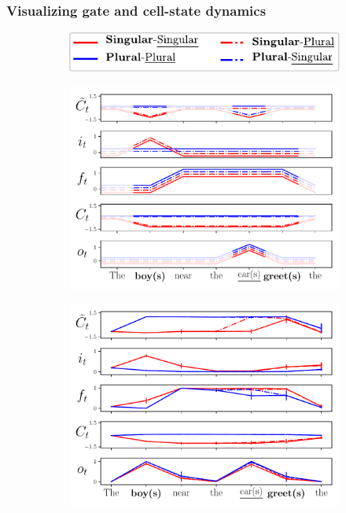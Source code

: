 \subsubsection{Visualizing gate and cell-state dynamics}\label{subsec:gate-dynamics}
\begin{figure}[ht]
    \centering
    \begin{subfigure}{\textwidth}
            \centering
            \includegraphics[width=0.3\linewidth]{Figures/legend.pdf}
    \end{subfigure}
    \bigskip
    \begin{subfigure}{0.32\textwidth}
            \centering
            \includegraphics[width=\linewidth]{Figures/unit-timeseries-cartoon.pdf}
    \label{fig:cartoon}
    \end{subfigure}
    \begin{subfigure}{0.32\textwidth}
            \centering
            \includegraphics[width=\linewidth]{Figures/nounpp_987.pdf}

\end{subfigure}
\end{figure}
